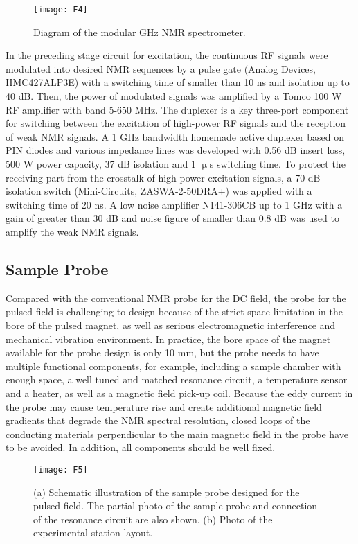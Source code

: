 \documentclass[lettersize,journal]{IEEEtran}
\begin{document}
\begin{figure}[t]
\centering
\texttt{[image: F4]}
\caption{Diagram of the modular GHz NMR spectrometer.}
\end{figure}

In the preceding stage circuit for excitation, the continuous RF signals were modulated into desired NMR sequences by a pulse gate (Analog Devices, HMC427ALP3E) with a switching time of smaller than 10 ns and isolation up to 40 dB. Then, the power of modulated signals was amplified by a Tomco 100 W RF amplifier with band 5-650 MHz. The duplexer is a key three-port component for switching between the excitation of high-power RF signals and the reception of weak NMR signals. A 1 GHz bandwidth homemade active duplexer based on PIN diodes and various impedance lines was developed with 0.56 dB insert loss, 500 W power capacity, 37 dB isolation and 1 $\upmu$s switching time. To protect the receiving part from the crosstalk of high-power excitation signals, a 70 dB isolation switch (Mini-Circuits, ZASWA-2-50DRA+) was applied with a switching time of 20 ns. A low noise amplifier N141-306CB up to 1 GHz with a gain of greater than 30 dB and noise figure of smaller than 0.8 dB was used to amplify the weak NMR signals.

\subsection{Sample Probe}
Compared with the conventional NMR probe for the DC field, the probe for the pulsed field is challenging to design because of the strict space limitation in the bore of the pulsed magnet, as well as serious electromagnetic interference and mechanical vibration environment. In practice, the bore space of the magnet available for the probe design is only 10 mm, but the probe needs to have multiple functional components, for example, including a sample chamber with enough space, a well tuned and matched resonance circuit, a temperature sensor and a heater, as well as a magnetic field pick-up coil. Because the eddy current in the probe may cause temperature rise and create additional magnetic field gradients that degrade the NMR spectral resolution, closed loops of the conducting materials perpendicular to the main magnetic field in the probe have to be avoided. In addition, all components should be well fixed.

\begin{figure}[thpb]
\centering
\texttt{[image: F5]}
\caption{(a) Schematic illustration of the sample probe designed for the pulsed field. The partial photo of the sample probe and connection of the resonance circuit are also shown. (b) Photo of the experimental station layout.}
\end{figure}
\end{document}

